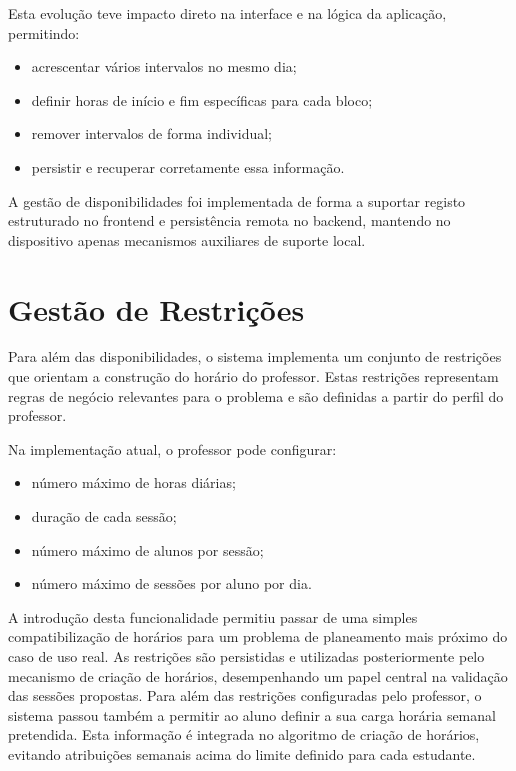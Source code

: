 Esta evolução teve impacto direto na interface e na lógica da aplicação, permitindo:

\begin{itemize}
    \item acrescentar vários intervalos no mesmo dia;
    \item definir horas de início e fim específicas para cada bloco;
    \item remover intervalos de forma individual;
    \item persistir e recuperar corretamente essa informação.
\end{itemize}


A gestão de disponibilidades foi implementada de forma a suportar registo estruturado no frontend e persistência remota no backend, mantendo no dispositivo apenas mecanismos auxiliares de suporte local.

\section{Gestão de Restrições}

Para além das disponibilidades, o sistema implementa um conjunto de restrições que orientam a construção do horário do professor.
Estas restrições representam regras de negócio relevantes para o problema e são definidas a partir do perfil do professor.

Na implementação atual, o professor pode configurar:

\begin{itemize}
    \item número máximo de horas diárias;
    \item duração de cada sessão;
    \item número máximo de alunos por sessão;
    \item número máximo de sessões por aluno por dia.
\end{itemize}

A introdução desta funcionalidade permitiu passar de uma simples compatibilização de horários para um problema de planeamento mais próximo do caso de uso real.
As restrições são persistidas e utilizadas posteriormente pelo mecanismo de criação de horários, desempenhando um papel central na validação das sessões propostas.
Para além das restrições configuradas pelo professor, o sistema passou também a permitir ao aluno definir a sua carga horária semanal pretendida. Esta informação é integrada no algoritmo de criação de horários, evitando atribuições semanais acima do limite definido para cada estudante.

